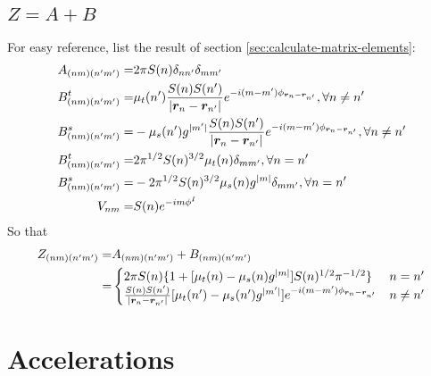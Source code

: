 \documentclass [10pt,letterpaper]{article}
\begin{document}
\subsection{$Z=A+B$}
\label{sub:Z-A-B}
For easy reference, list the result of section \ref{sec:calculate-matrix-elements}:
\begin{align} \label{eq:list-of-Z-A-B}
	A_{(n m)(n^\prime m^\prime)}
	=&
	2\pi S(n)
	\delta_{n n^\prime}
	\delta_{m m^\prime}
	\\
	B^t_{(n m)(n^\prime m^\prime)}
	=& 
	\mu_t(n^\prime) 
	\frac{S(n) S(n^\prime)}{\lvert\vectorsym{r}_n-\vectorsym{r}_{n^\prime}\rvert}
	e^{-i (m-m^\prime) \phi_{\vectorsym{r}_n-\vectorsym{r}_{n^\prime}}}
	,
	\forall n\neq n^\prime
	\\
	B^s_{(n m)(n^\prime m^\prime)}
	=&
	-
	\mu_s(n^\prime)g^{\lvert m^\prime \rvert} 
	\frac{S(n) S(n^\prime)}{\lvert\vectorsym{r}_n-\vectorsym{r}_{n^\prime}\rvert}
	e^{-i (m-m^\prime) \phi_{\vectorsym{r}_n-\vectorsym{r}_{n^\prime}}}
	,
	\forall n\neq n^\prime
	\\
	B^t_{(n m)(n^\prime m^\prime)}
	=&
	2 
	\pi^{1/2}
	S(n)^{3/2}
	\mu_t(n) 
	\delta_{m m^\prime}
	,
	\forall n = n^\prime
	\\
	B^s_{(n m)(n^\prime m^\prime)}
	=&
	-2 
	\pi^{1/2}
	S(n)^{3/2}
	\mu_s(n)g^{\lvert m\rvert} 
	\delta_{m m^\prime}
	,
	\forall n = n^\prime
	\\
	V_{n m}
	=&
	S(n)e^{-i m \phi^I}
\end{align}
So that
\begin{equation} \label{eq:result-Znmnpmp-1pt}
	\begin{split}
		Z_{(n m)(n^\prime m^\prime)}
		=&
		A_{(n m)(n^\prime m^\prime)}
		+
		B_{(n m)(n^\prime m^\prime)}
		\\
		=& 
		\begin{cases}
			2\pi S(n) 
			\{
			1+[ \mu_t(n) -\mu_s(n) g^{\lvert m \rvert} ] 
			S(n)^{1/2}\pi^{-1/2}
			\}
			&
			n=n^\prime
			\\
			\frac{S(n)S(n^\prime)}{\lvert \vectorsym{r}_n-\vectorsym{r}_{n^\prime} \rvert}
			[ \mu_t(n^\prime)-\mu_s(n^\prime) g^{\lvert m^\prime \rvert} ]
			e^{-i(m-m^\prime)\phi_{\vectorsym{r}_n-\vectorsym{r}_{n^\prime}}}
			&
			n \neq n^\prime
		\end{cases}
	\end{split}
\end{equation}



\section{Accelerations}
\label{sec:acceleration}
	
\end{document}

